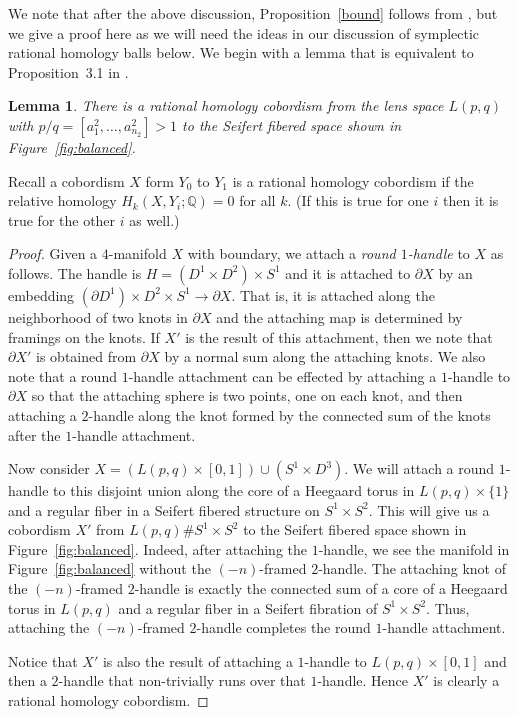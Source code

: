 \documentclass[11pt]{amsart}
\theoremstyle{plain}
\newtheorem{lemma}[theorem]{Lemma}
\theoremstyle{definition}
\theoremstyle{remark}
\numberwithin{theorem}{section}
\newcommand{\dfn}[1]{{\em #1}}        %
\newcommand{\Q}{\mathbb{Q}}           %
\begin{document}
We note that after the above discussion, Proposition~\ref{bound} follows from \cite[Corollary~3.3]{Lecuona2019}, but we give a proof here as we will need the ideas in our discussion of symplectic rational homology balls below. We begin with a lemma that is equivalent to Proposition~3.1 in \cite{Lecuona2019}.
\begin{lemma}\label{qhc}  There is a rational homology cobordism   from the lens space $L(p,q)$ with $p/q=[a^2_1,\ldots, a^2_{n_2}]>1$ to the Seifert fibered space shown in Figure~\ref{fig:balanced}.
\end{lemma}
Recall a cobordism $X$ form $Y_0$ to $Y_1$ is a rational homology cobordism if the relative homology $H_k(X,Y_i;\Q)=0$ for all $k$. (If this is true for one $i$ then it is true for the other $i$ as well.)
\begin{proof}
Given a $4$-manifold $X$ with boundary, we attach a \dfn{round $1$-handle} to $X$ as follows. The handle is $H=(D^1\times D^2)\times S^1$ and it is attached to $\partial X$ by an embedding $(\partial D^1)\times D^2\times S^1\to \partial X$. That is, it is attached along the neighborhood of two knots in $\partial X$ and the attaching map  is determined by framings on the knots. If $X'$ is the result of this attachment, then we note that $\partial X'$ is obtained from $\partial X$ by a normal sum along the attaching knots. We also note that a round $1$-handle attachment can be effected by attaching a $1$-handle to $\partial X$ so that the attaching sphere is two points, one on each knot, and then attaching a $2$-handle along the knot formed by the connected sum of the knots after the $1$-handle attachment. 

Now consider $X=(L(p,q)\times [0,1])\cup (S^1\times D^3)$. We will attach a round $1$-handle to this disjoint union along the core of a Heegaard torus in $L(p,q)\times \{1\}$ and a regular fiber in a Seifert fibered structure on $S^1\times S^2$. This will give us a cobordism $X'$ from $L(p,q)\#S^1\times S^2$ to the Seifert fibered space shown in Figure~\ref{fig:balanced}. Indeed, after attaching the $1$-handle, we see the manifold in Figure~\ref{fig:balanced} without the $(-n)$-framed $2$-handle. The attaching knot of the  $(-n)$-framed $2$-handle is exactly the connected sum of a core of a Heegaard torus in $L(p,q)$ and a regular fiber in a Seifert fibration of $S^1\times S^2$. Thus, attaching the $(-n)$-framed $2$-handle completes the round $1$-handle attachment. 

Notice that $X'$ is also the result of attaching a $1$-handle to $L(p,q)\times [0,1]$ and then a $2$-handle that non-trivially runs over that $1$-handle. Hence $X'$ is clearly a rational homology cobordism.
\end{proof}
\end{document}
